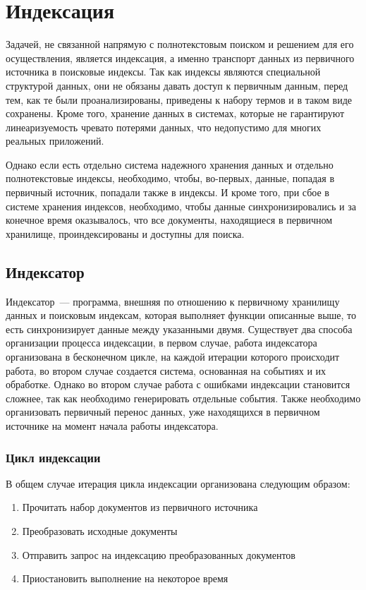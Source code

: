 \section{Индексация}

Задачей, не связанной напрямую с полнотекстовым поиском и решением для его осуществления, является индексация, а именно транспорт данных из первичного источника в поисковые индексы. Так как индексы являются специальной структурой данных, они не обязаны давать доступ к первичным данным, перед тем, как те были проанализированы, приведены к набору термов и в таком виде сохранены. Кроме того, хранение данных в системах, которые не гарантируют линеаризуемость чревато потерями данных, что недопустимо для многих реальных приложений.

Однако если есть отдельно система надежного хранения данных и отдельно полнотекстовые индексы, необходимо, чтобы, во-первых, данные, попадая в первичный источник, попадали также в индексы. И кроме того, при сбое в системе хранения индексов, необходимо, чтобы данные синхронизировались и за конечное время оказывалось, что все документы, находящиеся в первичном хранилище, проиндексированы и доступны для поиска.

\subsection{Индексатор}

Индексатор~--- программа, внешняя по отношению к первичному хранилищу данных и поисковым индексам, которая выполняет функции описанные выше, то есть синхронизирует данные между указанными двумя. Существует два способа организации процесса индексации, в первом случае, работа индексатора организована в бесконечном цикле, на каждой итерации которого происходит работа, во втором случае создается система, основанная на событиях и их обработке. Однако во втором случае работа с ошибками индексации становится сложнее, так как необходимо генерировать отдельные события. Также необходимо организовать первичный перенос данных, уже находящихся в первичном источнике на момент начала работы индексатора.

\subsubsection{Цикл индексации}

В общем случае итерация цикла индексации организована следующим образом:

\begin{enumerate}
	\item Прочитать набор документов из первичного источника
	\item Преобразовать исходные документы
	\item Отправить запрос на индексацию преобразованных документов
	\item Приостановить выполнение на некоторое время
\end{enumerate}

